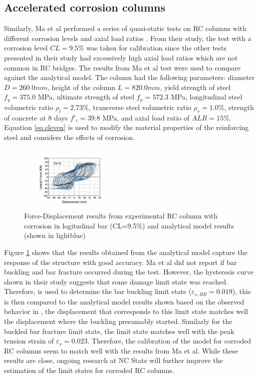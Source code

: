 \subsection{Accelerated corrosion columns}
Similarly, Ma et al performed a series of quasi-static tests on RC columns with different corrosion levels and axial load ratios \cite{Ma2012}. From their study, the test with a corrosion level $CL=9.5\%$ was taken for calibration since the other tests presented in their study had excessively high axial load ratios which are not common in RC bridges. The results from Ma et al test	\cite{Ma2012} were used to compare against the analytical model. The column had the following parameters: diameter $D = 260.0 mm$, height of the column $L = 820.0 mm$, yield strength of steel $f_{y} = 375.0$ MPa, ultimate strength of steel $f_{u} = 572.3$ MPa, longitudinal steel volumetric ratio $\rho_{l} = 2.73\% $, transverse steel volumetric ratio $\rho_{v} = 1.0\% $, strength of concrete at 8 days $f'_{c} = 39.8$ MPa, and axial load ratio of $ALR=15\%$. Equation \ref{eq.eleven} is used to modify the material properties of the reinforcing steel and considers the effects of corrosion. 

\begin{figure}[htbp]
	\centering
	\includegraphics[width=0.50\textwidth]{Chapter-5/figs/Model_vs_MaEtAl_220218.pdf}
	\caption{Force-Displacement results from experimental RC column with corrosion in logitudinal bar (CL=9.5\%) \cite{Ma2012} and analytical model results (shown in lightblue)}
	\label{fig:ModelCalibration_Corrosion}
\end{figure}

Figure \ref{fig:ModelCalibration_Corrosion} shows that the results obtained from the analytical model capture the response of the structure with good accuracy. Ma et al \cite{Ma2012} did not report if bar buckling and bar fracture occurred during the test. However, the hysteresis curve shown in their study suggests that some damage limit state was reached. Therefore,  is used to determine the bar buckling limit state ($\varepsilon_{s,BB}=0.019$), this is then compared to the analytical model results shown  based on the observed behavior in , the displacement that corresponds to this limit state matches well the displacement where the buckling presumably started. Similarly for the buckled bar fracture limit state, the limit state matches well with the peak tension strain of $\varepsilon_{s}=0.023$. Therefore, the calibration of the model for corroded RC columns seem to match well with the results from Ma et al. While these results are close, ongoing research at NC State will further improve the estimation of the limit states for corroded RC columns.

